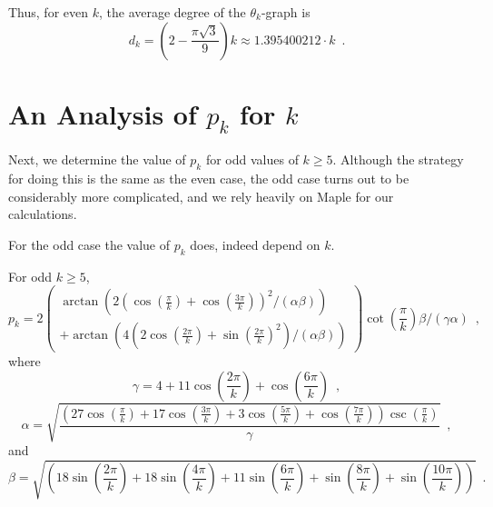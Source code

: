 \documentclass{patmorin}
\begin{document}
Thus, for even $k$, the average degree of the $\theta_k$-graph is 
\[ d_k = \left(2-\frac{\pi\sqrt{3}}{9}\right)k \approx 1.395400212\cdot k \enspace . \]

\section{An Analysis of $p_k$ for $k$}

Next, we determine the value of $p_k$ for odd values of
$k\ge 5$.  Although the strategy for doing this is the same as the even
case, the odd case turns out to be considerably more complicated, and
we rely heavily on Maple for our calculations.

For the odd case the value of $p_k$ does, indeed depend on $k$.

\begin{lem}
  For odd $k\ge 5$,
\[
p_k = 
2
\left(\begin{array}{l}
  \arctan\left(
     2\left(\cos\left(\frac{\pi }{k}\right)
       +\cos\left(\frac{3 \pi }{k}\right)\right)^2 / (\alpha\beta) 
  \right) \\
   + \arctan\left(
       4 \left(2 \cos\left(\frac{2 \pi }{k}\right)
       +\sin\left(\frac{2 \pi }{k}\right)^2\right)/(\alpha\beta) 
     \right)
  \end{array}
\right)
\cot\left(\frac{\pi }{k}\right) 
\beta
/
\left(\gamma \alpha\right)\enspace ,
\]
where
\[
\gamma =4+11 \cos\left(\frac{2 \pi }{k}\right)+\cos\left(\frac{6 \pi }{k}\right) \enspace ,
\]
\[
\alpha = 
\sqrt{\frac{\left(27 \cos\left(\frac{\pi }{k}\right)+17 \cos\left(\frac{3 \pi }{k}\right)+3 \cos\left(\frac{5 \pi }{k}\right)+\cos\left(\frac{7 \pi }{k}\right)\right) \csc\left(\frac{\pi }{k}\right)}{\gamma}} \enspace ,
\]
and
\[
\beta = \sqrt{\left(18 \sin\left(\frac{2 \pi }{k}\right)+18 \sin\left(\frac{4 \pi }{k}\right)+11 \sin\left(\frac{6 \pi }{k}\right)+\sin\left(\frac{8 \pi }{k}\right)+\sin\left(\frac{10 \pi }{k}\right)\right)} \enspace .
\]
\end{lem}
\end{document}
